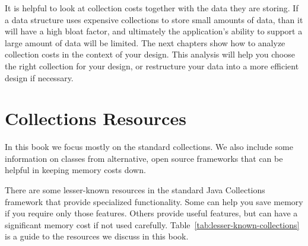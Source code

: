 It is helpful to look at collection costs 
together with the data they are storing. If a data structure uses expensive collections
to store small amounts of data, than it
will have a high bloat factor, and ultimately the application's ability to
support a large amount of data will be limited. The next chapters show
how to analyze collection costs in the context of your design.
This analysis will help you choose the right collection for your design, or
restructure your data into a more efficient design if necessary.


\section{Collections Resources}


In this book we focus
mostly on the standard collections. We also include some information on classes
from alternative, open source frameworks that can be helpful in keeping
memory costs down.


There are some lesser-known resources in the standard Java
Collections framework that provide specialized functionality. Some can help you
save memory if you require only those features.  Others provide useful
features, but can have a significant memory cost if not used carefully.
Table~\ref{tab:lesser-known-collections} is a guide to the resources we discuss
in this book.

